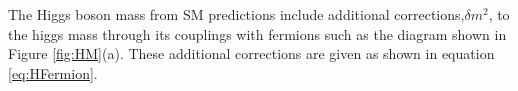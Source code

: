 {%
The Higgs boson mass from SM predictions include additional corrections,$\delta m^{2}$, to the higgs mass through its couplings with fermions such as the diagram shown in Figure \ref{fig:HM}(a). These additional corrections are given as shown in equation \ref{eq:HFermion}.

}

